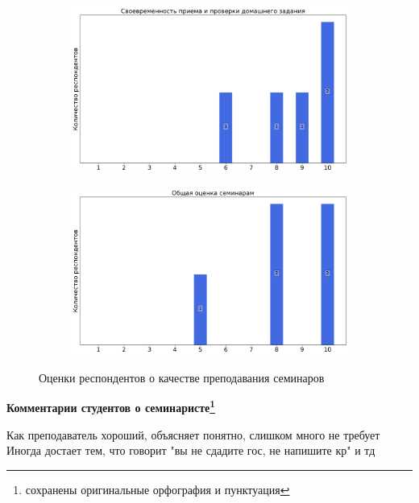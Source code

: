 \begin{figure}[H]
\begin{subfigure}[b]{0.45\textwidth}
                    \centering
                    \includegraphics[width=\textwidth]{images/3 course/Общая физика - квантовая физика/seminarists-marks-Лапушкин Г.И.-2.png}
                \end{subfigure}
                \begin{subfigure}[b]{0.45\textwidth}
                    \centering
                    \includegraphics[width=\textwidth]{images/3 course/Общая физика - квантовая физика/seminarists-marks-Лапушкин Г.И.-3.png}
                \end{subfigure}	
                \caption{Оценки респондентов о качестве преподавания семинаров}
            \end{figure}

            \textbf{Комментарии студентов о семинаристе\protect\footnote{сохранены оригинальные орфография и пунктуация}}
                \begin{commentbox} 
                    Как преподаватель хороший, объясняет понятно, слишком много не требует
                    Иногда достает тем, что говорит "вы не сдадите гос, не напишите кр" и тд 
                \end{commentbox} 
        

